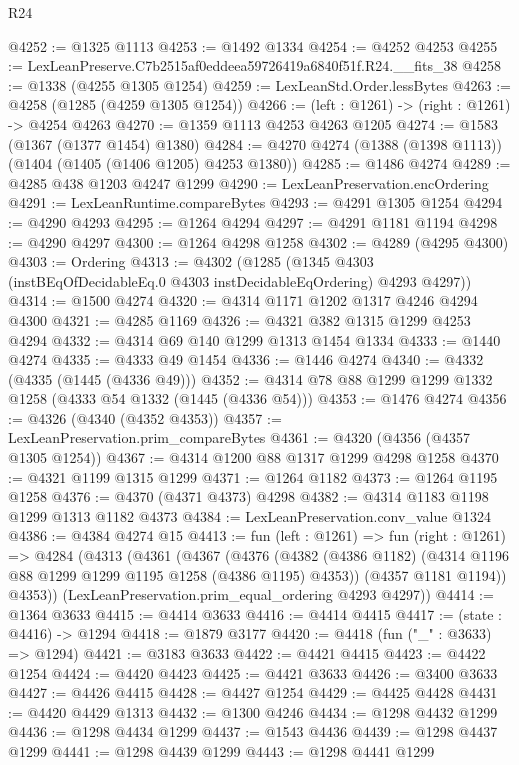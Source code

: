 \begin{lexlean}{R24}
\begin{coremodule}
@4252 := @1325 @1113
@4253 := @1492 @1334
@4254 := @4252 @4253
@4255 := LexLeanPreserve.C7b2515af0eddeea59726419a6840f51f.R24.__fits_38
@4258 := @1338 (@4255 @1305 @1254)
@4259 := LexLeanStd.Order.lessBytes
@4263 := @4258 (@1285 (@4259 @1305 @1254))
@4266 := (left : @1261) -> (right : @1261) -> @4254 @4263
@4270 := @1359 @1113 @4253 @4263 @1205
@4274 := @1583 (@1367 (@1377 @1454) @1380)
@4284 := @4270 @4274 (@1388 (@1398 @1113)) (@1404 (@1405 (@1406 @1205) @4253 @1380))
@4285 := @1486 @4274
@4289 := @4285 @438 @1203 @4247 @1299
@4290 := LexLeanPreservation.encOrdering
@4291 := LexLeanRuntime.compareBytes
@4293 := @4291 @1305 @1254
@4294 := @4290 @4293
@4295 := @1264 @4294
@4297 := @4291 @1181 @1194
@4298 := @4290 @4297
@4300 := @1264 @4298 @1258
@4302 := @4289 (@4295 @4300)
@4303 := Ordering
@4313 := @4302
    (@1285 (@1345 @4303 (instBEqOfDecidableEq.{0} @4303 instDecidableEqOrdering) @4293 @4297))
@4314 := @1500 @4274
@4320 := @4314 @1171 @1202 @1317 @4246 @4294 @4300
@4321 := @4285 @1169
@4326 := @4321 @382 @1315 @1299 @4253 @4294
@4332 := @4314 @69 @140 @1299 @1313 @1454 @1334
@4333 := @1440 @4274
@4335 := @4333 @49 @1454
@4336 := @1446 @4274
@4340 := @4332 (@4335 (@1445 (@4336 @49)))
@4352 := @4314 @78 @88 @1299 @1299 @1332 @1258 (@4333 @54 @1332 (@1445 (@4336 @54)))
@4353 := @1476 @4274
@4356 := @4326 (@4340 (@4352 @4353))
@4357 := LexLeanPreservation.prim_compareBytes
@4361 := @4320 (@4356 (@4357 @1305 @1254))
@4367 := @4314 @1200 @88 @1317 @1299 @4298 @1258
@4370 := @4321 @1199 @1315 @1299
@4371 := @1264 @1182
@4373 := @1264 @1195 @1258
@4376 := @4370 (@4371 @4373) @4298
@4382 := @4314 @1183 @1198 @1299 @1313 @1182 @4373
@4384 := LexLeanPreservation.conv_value @1324
@4386 := @4384 @4274 @15
@4413 := fun (left : @1261) =>
  fun (right : @1261) =>
  @4284
    (@4313
      (@4361
        (@4367
          (@4376
            (@4382 (@4386 @1182) (@4314 @1196 @88 @1299 @1299 @1195 @1258 (@4386 @1195) @4353))
            (@4357 @1181 @1194))
          @4353))
      (LexLeanPreservation.prim_equal_ordering @4293 @4297))
@4414 := @1364 @3633
@4415 := @4414 @3633
@4416 := @4414 @4415
@4417 := (state : @4416) -> @1294
@4418 := @1879 @3177
@4420 := @4418 (fun ("_" : @3633) => @1294)
@4421 := @3183 @3633
@4422 := @4421 @4415
@4423 := @4422 @1254
@4424 := @4420 @4423
@4425 := @4421 @3633
@4426 := @3400 @3633
@4427 := @4426 @4415
@4428 := @4427 @1254
@4429 := @4425 @4428
@4431 := @4420 @4429 @1313
@4432 := @1300 @4246
@4434 := @1298 @4432 @1299
@4436 := @1298 @4434 @1299
@4437 := @1543 @4436
@4439 := @1298 @4437 @1299
@4441 := @1298 @4439 @1299
@4443 := @1298 @4441 @1299

\end{coremodule}
\end{lexlean}
